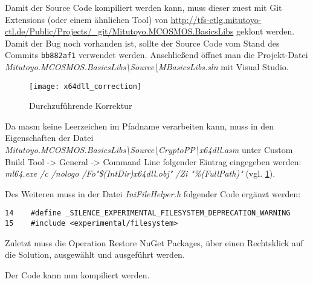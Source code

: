 Damit der Source Code kompiliert werden kann, muss dieser zuest mit Git Extensions (oder einem ähnlichen Tool) von
\url{http://tfs-ctlg.mitutoyo-ctl.de/Public/Projects/_git/Mitutoyo.MCOSMOS.BasicsLibs} geklont werden. Damit der Bug noch vorhanden ist, sollte der Source Code vom Stand des
Commits \verb|bb882af1| verwendet werden. \newline
Anschließend öffnet man die Projekt-Datei \textit{Mitutoyo.MCOSMOS.BasicsLibs\textbackslash Source\textbackslash MBasicsLibs.sln} mit Visual Studio.

\begin{figure}[htpb]
    \centering
    \texttt{[image: x64dll\_correction]}
    \caption{Durchzuführende Korrektur}
    \label{img:x64dll_correction}
\end{figure}

Da \gls{masm} keine Leerzeichen im Pfadname verarbeiten kann, muss in den Eigenschaften der Datei
\textit{Mitutoyo.MCOSMOS.BasicsLibs\textbackslash Source\textbackslash CryptoPP\textbackslash x64dll.asm} unter \glqq{}Custom Build Tool\grqq{}
-> \glqq{}General\grqq{} -> \glqq{}Command Line\grqq{} folgender Eintrag eingegeben werden: \textit{ml64.exe /c /nologo /Fo"\$(IntDir)x64dll.obj" /Zi "\%(FullPath)"}
(vgl. \ref{img:x64dll_correction}).

Des Weiteren muss in der Datei \textit{IniFileHelper.h} folgender Code ergänzt werden:
\begin{lstlisting}
14    #define _SILENCE_EXPERIMENTAL_FILESYSTEM_DEPRECATION_WARNING
15    #include <experimental/filesystem>
\end{lstlisting}

Zuletzt muss die Operation \glqq{}Restore NuGet Packages\grqq{}, über einen Rechtsklick auf die Solution, ausgewählt und ausgeführt werden.

Der Code kann nun kompiliert werden.